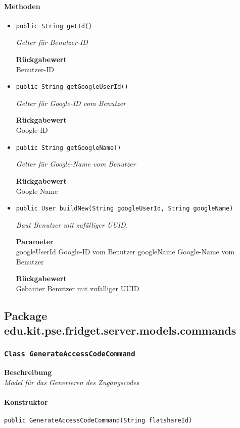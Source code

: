     \paragraph*{Methoden}
    \begin{itemize}
    	\item{\texttt{public String getId()}}
    	
    	\textit{Getter für Benutzer-ID}
    	
    	
    	
    	\textbf{Rückgabewert} \\
    	Benutzer-ID        \item{\texttt{public String getGoogleUserId()}}
    	
    	\textit{Getter für Google-ID vom Benutzer}
    	
    	
    	
    	\textbf{Rückgabewert} \\
    	Google-ID        \item{\texttt{public String getGoogleName()}}
    	
    	\textit{Getter für Google-Name vom Benutzer}
    	
    	
    	
    	\textbf{Rückgabewert} \\
    	Google-Name        \item{\texttt{public User buildNew(String googleUserId, String googleName)}}
    	
    	\textit{Baut Benutzer mit zufälliger UUID.}
    	
    	\textbf{Parameter} \\
    	googleUserId Google-ID vom Benutzer
    	googleName Google-Name vom Benutzer
    	
    	\textbf{Rückgabewert} \\
    	Gebauter Benutzer mit zufälliger UUID
    \end{itemize}
    \subsection{Package edu.kit.pse.fridget.server.models.commands}
    \subsubsection{\texttt{Class GenerateAccessCodeCommand}}
    \textbf{Beschreibung} \\
    \textit{Model für das Generieren des Zugangscodes}
    \paragraph*{Konstruktor}
    \texttt{public GenerateAccessCodeCommand(String flatshareId)}
